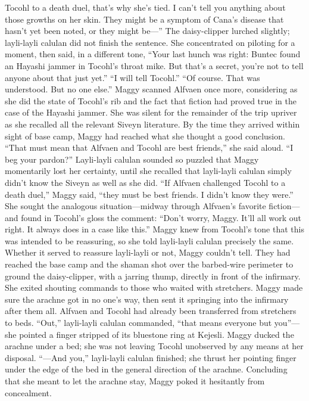 \documentclass[9pt]{article}
\begin{document}
Tocohl to a death duel, that’s why she’s tied. I can’t tell you anything about those growths on her skin.
They might be a symptom of Cana’s disease that hasn’t yet been noted, or they might be—” The
daisy-clipper lurched slightly; layli-layli calulan did not finish the sentence.
She concentrated on piloting for a moment, then said, in a different tone, “Your last hunch was right:
Buntec found an Hayashi jammer in Tocohl’s throat mike. But that’s a secret, you’re not to tell anyone
about that just yet.”
“I will tell Tocohl.”
“Of course. That was understood. But no one else.”
Maggy scanned Alfvaen once more, considering as she did the state of Tocohl’s rib and the fact that
fiction had proved true in the case of the Hayashi jammer. She was silent for the remainder of the trip
upriver as she recalled all the relevant Siveyn literature.
By the time they arrived within sight of base camp, Maggy had reached what she thought a good
conclusion. “That must mean that Alfvaen and Tocohl are best friends,” she said aloud.
“I beg your pardon?”
Layli-layli calulan sounded so puzzled that Maggy momentarily lost her certainty, until she recalled
that layli-layli calulan simply didn’t know the Siveyn as well as she did. “If Alfvaen challenged Tocohl
to a death duel,” Maggy said, “they must be best friends. I didn’t know they were.” She sought the
analogous situation—midway through Alfvaen’s favorite fiction—and found in Tocohl’s gloss the
comment: “Don’t worry, Maggy. It’ll all work out right. It always does in a case like this.” Maggy knew
from Tocohl’s tone that this was intended to be reassuring, so she told layli-layli calulan precisely the
same.
Whether it served to reassure layli-layli or not, Maggy couldn’t tell. They had reached the base
camp and the shaman shot over the barbed-wire perimeter to ground the daisy-clipper, with a jarring
thump, directly in front of the infirmary. She exited shouting commands to those who waited with
stretchers.
Maggy made sure the arachne got in no one’s way, then sent it springing into the infirmary after them
all.
Alfvaen and Tocohl had already been transferred from stretchers to beds. “Out,” layli-layli calulan
commanded, “that means everyone but you”—she pointed a finger stripped of its bluestone ring at
Kejesli. Maggy ducked the arachne under a bed; she was not leaving Tocohl unobserved by any means
at her disposal. “—And you,” layli-layli calulan finished; she thrust her pointing finger under the edge of
the bed in the general direction of the arachne.
Concluding that she meant to let the arachne stay, Maggy poked it hesitantly from concealment.
\end{document}
